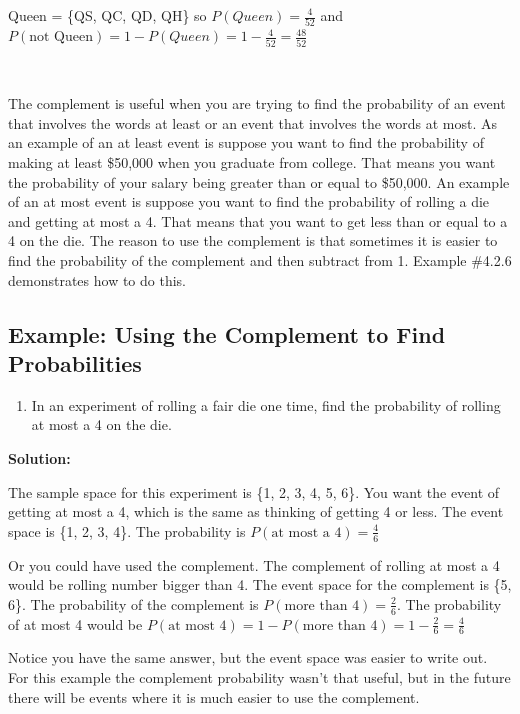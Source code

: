 \documentclass[
]{book}
\providecommand{\tightlist}{%
  \setlength{\itemsep}{0pt}\setlength{\parskip}{0pt}}
\begin{document}
Queen = \{QS, QC, QD, QH\} so \(P(Queen)=\frac{4}{52}\) and \(P(\text{not Queen})=1-P(Queen)=1-\frac{4}{52}=\frac{48}{52}\)

\textbf{\\
}

The complement is useful when you are trying to find the probability of an event that involves the words at least or an event that involves the words at most. As an example of an at least event is suppose you want to find the probability of making at least \$50,000 when you graduate from college. That means you want the probability of your salary being greater than or equal to \$50,000. An example of an at most event is suppose you want to find the probability of rolling a die and getting at most a 4. That means that you want to get less than or equal to a 4 on the die. The reason to use the complement is that sometimes it is easier to find the probability of the complement and then subtract from 1. Example \#4.2.6 demonstrates how to do this.

\hypertarget{example-using-the-complement-to-find-probabilities}{%
\subsection{Example: Using the Complement to Find Probabilities}\label{example-using-the-complement-to-find-probabilities}}

\begin{enumerate}
\def\labelenumi{\alph{enumi}.}
\tightlist
\item
  In an experiment of rolling a fair die one time, find the probability of rolling at most a 4 on the die.
\end{enumerate}

\textbf{Solution:}

The sample space for this experiment is \{1, 2, 3, 4, 5, 6\}. You want the event of getting at most a 4, which is the same as thinking of getting 4 or less. The event space is \{1, 2, 3, 4\}. The probability is \(P(\text{at most a 4})=\frac{4}{6}\)

Or you could have used the complement. The complement of rolling at most a 4 would be rolling number bigger than 4. The event space for the complement is \{5, 6\}. The probability of the complement is \(P(\text{more than 4})=\frac{2}{6}\). The probability of at most 4 would be \(P(\text{at most 4})=1-P(\text{more than 4})=1-\frac{2}{6}=\frac{4}{6}\)

Notice you have the same answer, but the event space was easier to write out. For this example the complement probability wasn't that useful, but in the future there will be events where it is much easier to use the
complement.
\end{document}
